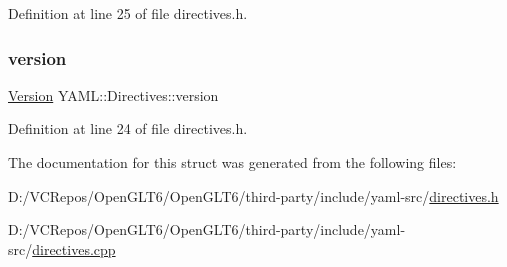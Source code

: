 Definition at line 25 of file directives.\+h.

\mbox{\label{struct_y_a_m_l_1_1_directives_a15d6b1ed53add761d81599654a9ea35a}} 
\subsubsection{\texorpdfstring{version}{version}}
{\footnotesize\ttfamily \mbox{\hyperlink{struct_y_a_m_l_1_1_version}{Version}} Y\+A\+M\+L\+::\+Directives\+::version}



Definition at line 24 of file directives.\+h.



The documentation for this struct was generated from the following files\+:\begin{DoxyCompactItemize}
\item 
D\+:/\+V\+C\+Repos/\+Open\+G\+L\+T6/\+Open\+G\+L\+T6/third-\/party/include/yaml-\/src/\mbox{\hyperlink{directives_8h}{directives.\+h}}\item 
D\+:/\+V\+C\+Repos/\+Open\+G\+L\+T6/\+Open\+G\+L\+T6/third-\/party/include/yaml-\/src/\mbox{\hyperlink{directives_8cpp}{directives.\+cpp}}\end{DoxyCompactItemize}

